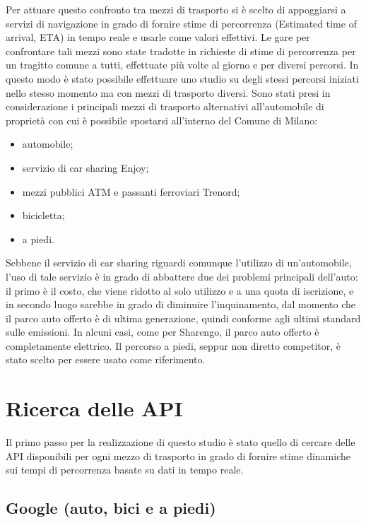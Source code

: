 Per attuare questo confronto tra mezzi di trasporto si è scelto di appoggiarsi a servizi di navigazione in grado di fornire stime di percorrenza (Estimated time of arrival, ETA) in tempo reale e usarle come valori effettivi. Le gare per confrontare tali mezzi sono state tradotte in richieste di stime di percorrenza per un tragitto comune a tutti, effettuate più volte al giorno e per diversi percorsi. In questo modo è stato possibile effettuare uno studio su degli stessi percorsi iniziati nello stesso momento ma con mezzi di trasporto diversi. Sono stati presi in considerazione i principali mezzi di trasporto alternativi all'automobile di proprietà con cui è possibile spostarsi all'interno del Comune di Milano:
\begin{itemize}
	\item automobile;
	\item servizio di car sharing Enjoy;
	\item mezzi pubblici ATM e passanti ferroviari Trenord;
	\item bicicletta;
	\item a piedi.
\end{itemize}
Sebbene il servizio di car sharing riguardi comunque l'utilizzo di un'automobile, l'uso di tale servizio è in grado di abbattere due dei problemi principali dell'auto: il primo è il costo, che viene ridotto al solo utilizzo e a una quota di iscrizione, e in secondo luogo sarebbe in grado di diminuire l'inquinamento, dal momento che il parco auto offerto è di ultima generazione, quindi conforme agli ultimi standard sulle emissioni. In alcuni casi, come per Sharengo, il parco auto offerto è completamente elettrico. Il percorso a piedi, seppur non diretto competitor, è stato scelto per essere usato come riferimento.

\section{Ricerca delle API}

Il primo passo per la realizzazione di questo studio è stato quello di cercare delle API disponibili per ogni mezzo di trasporto in grado di fornire stime dinamiche sui tempi di percorrenza basate su dati in tempo reale.

\subsection{Google (auto, bici e a piedi)}

